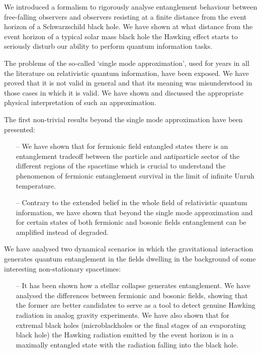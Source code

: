 \begin{list}{}{\leftmargin=1em}
\begin{itemize}
\end{itemize}
\item We introduced a formalism to rigorously analyse entanglement behaviour between free-falling observers and observers resisting at a finite distance from the event horizon of a Schwarzschild black hole. We have shown at what distance from the event horizon of a typical solar mass black hole the Hawking effect starts to seriously disturb our ability to perform quantum information tasks.
\item The problems of the so-called `single mode approximation', used for years in all the literature on relativistic quantum information, have been exposed.  We have proved that it is not valid in general and that its meaning was misunderstood in those cases in which it is valid. We have shown and discussed the appropriate physical interpretation of such an approximation.  
 \item The first non-trivial results beyond the single mode approximation have been presented:
 \begin{itemize}
 \item[--] We have shown that for fermionic field entangled states there is an entanglement tradeoff between the particle and antiparticle sector of the different regions of the spacetime which is crucial to understand the phenomenon of fermionic entanglement survival in the limit of infinite Unruh temperature.
 \item[--] Contrary to the extended belief in the whole field of relativistic quantum information, we have shown that beyond the single mode approximation and for certain states of both fermionic and bosonic fields entanglement can be amplified instead of degraded.
 \end{itemize}
 \item We have analysed two dynamical scenarios in which the gravitational interaction generates quantum entanglement in the fields dwelling in the background of some interesting non-stationary spacetimes:
 \begin{itemize}
 \item[--] It has been shown how a stellar collapse generates entanglement. We have analysed the differences between fermionic and bosonic fields, showing that the former are better candidates to serve as a tool to detect genuine Hawking radiation in analog gravity experiments. We have also shown that for extremal black holes (microblackholes or the final stages of an evaporating black hole) the Hawking radiation emitted by the event horizon is in a maximally entangled state with the radiation falling into the black hole.

\end{itemize}
\end{list}
